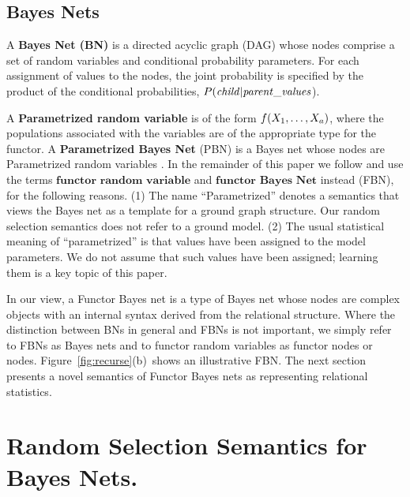 \documentclass[oribibl]{llncs}
\begin{document}
\subsection{Bayes Nets}

 A {\bf Bayes Net (BN)} is a directed acyclic graph (DAG) whose nodes comprise a set of random variables and conditional probability parameters.
For each assignment of values to the nodes, the joint probability 
is specified by the product of the conditional probabilities, $P(\it{child}|\it{parent\_values}$). 

A \textbf{Parametrized random variable} is of the form $f(X_{1},\ldots,X_{a})$, where the populations associated with the variables are of the appropriate type for the functor. 
%
A \textbf{Parametrized Bayes Net} (PBN) is a Bayes net whose nodes are Parametrized random variables \cite{Poole2003}. In the remainder of this paper we follow \cite{Schulte2012} and use the terms $\textbf{functor random variable}$ and $\textbf{functor Bayes Net}$ instead (FBN), for the following reasons. (1) The name ``Parametrized'' denotes a semantics that views the Bayes net as a template for a ground graph structure. Our random selection semantics does not refer to a ground model.  (2) The usual statistical meaning of ``parametrized'' is that values have been assigned to the model parameters. We do not assume that such values have been assigned; learning them is a key topic of this paper. 

In our view, a Functor Bayes net is a type of Bayes net whose nodes are complex objects with an internal syntax derived from the relational structure. Where the distinction between BNs in general and FBNs is not important, we simply refer to FBNs as Bayes nets and to functor random variables as functor nodes or nodes. Figure~\ref{fig:recurse}(b)~shows an illustrative FBN. The next section presents a novel semantics of Functor Bayes nets as representing relational statistics.

\section{Random Selection Semantics for Bayes Nets.}
\label{sec:class-level} 

\end{document}

